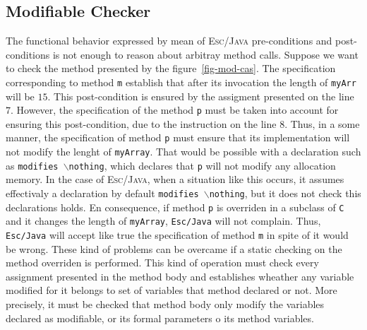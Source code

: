 \documentclass[a4paper]{llncs}
\begin{document}
\subsection{\bf Modifiable Checker}
The functional behavior expressed by mean of \textsc{Esc/Java}
pre-conditions and post-conditions is not enough to reason about
arbitray method calls. Suppose we want to check the method presented by
the figure~\ref{fig-mod-cas}. The specification corresponding to
method \texttt{m} establish that after its invocation the length of
\texttt{myArr} will be $15$. This post-condition is ensured by
the assigment presented on the line $7$. However, the specification of
the
method \texttt{p} must be taken into account for ensuring this
post-condition, due to the instruction on the line $8$. Thus, in a
some manner, the specification of method \texttt{p} must ensure that
its implementation
will not modify the lenght of \texttt{myArray}. That would be possible
with a declaration such as \texttt{modifies $\backslash$nothing}, which
declares that \texttt{p} will not modify any allocation memory. In the 
case of \textsc{Esc/Java}, when a 
situation like this occurs, it assumes effectivaly a
declaration by default \texttt{modifies $\backslash$nothing}, but it
does not check this declarations holds. En consequence, if
method \texttt{p} is overriden in a subclass of \texttt{C} and it
changes the length of \texttt{myArray},
\texttt{Esc/Java} will not complain. Thus, \texttt{Esc/Java} will
accept like true the specification of method \texttt{m} in spite of it
would be wrong. These kind of problems can be overcame if a static checking on
the method overriden is performed. This kind of operation must check
every assignment presented in the method body and establishes wheather
any variable modified for it belongs to set of variables that method
declared or not. More precisely, it must be checked that method body
only modify the variables declared as modifiable, or its formal
parameters o its method variables. 
\end{document}
